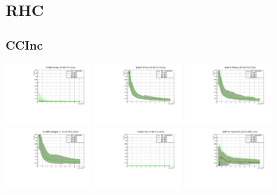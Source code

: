 \begin{center}
\end{center}

\subsection{RHC}

\subsubsection{CCInc}

\begin{center}

  \includegraphics[width=0.245\textwidth]{plots/Elost_profiles/Proton_KE_RHC_CCInc.pdf}
  \includegraphics[width=0.245\textwidth]{plots/Elost_profiles/PiPlus_KE_RHC_CCInc.pdf}
  \includegraphics[width=0.245\textwidth]{plots/Elost_profiles/PiMinus_KE_RHC_CCInc.pdf}
  \includegraphics[width=0.245\textwidth]{plots/Elost_profiles/Charged_Pi_KE_RHC_CCInc.pdf}
  \includegraphics[width=0.245\textwidth]{plots/Elost_profiles/Pi0_KE_RHC_CCInc.pdf}
  \includegraphics[width=0.245\textwidth]{plots/Elost_profiles/Proton+Pion_KE_RHC_CCInc.pdf}

\end{center}
